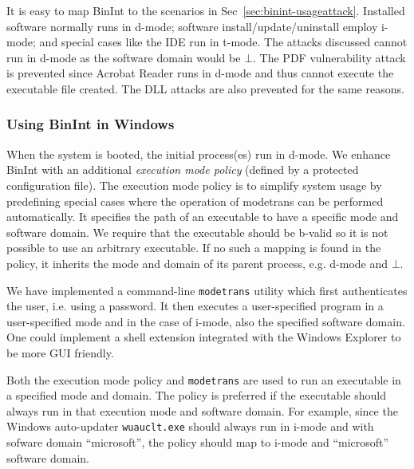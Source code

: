 It is easy to map BinInt to the scenarios in Sec~\ref{sec:binint-usageattack}.
Installed software normally runs in d-mode;
software install/up\-date/uninstall employ i-mode;
and special cases like the IDE run in t-mode.
The attacks discussed cannot run in d-mode as the software
domain would be $\bot$.
The PDF vulnerability attack is prevented since Acrobat Reader
runs in d-mode and thus cannot execute the executable file created.
The DLL attacks are also prevented for the same reasons.

\subsubsection{Using BinInt in Windows}

When the system is booted, the initial process(es) run in d-mode.
We enhance  BinInt with an additional
{\em execution mode policy} (defined by a protected configuration file).
The execution mode policy is to simplify system usage by predefining
special cases where the operation of modetrans can be performed
automatically.
It specifies the path of an 
executable to have a specific mode and software domain.
We require that the executable should be b-valid so it is not possible
to use an arbitrary executable.
If no such a mapping is found in the policy, 
it inherits the mode and domain of its parent process, e.g. d-mode and $\bot$.

We have implemented a command-line {\tt modetrans} utility which
first authenticates the user, i.e. using a password.
It then executes a user-specified program in a user-specified mode and 
in the case of i-mode, also the specified software domain.
One could implement a shell extension integrated with the Windows Explorer
to be more GUI friendly.

Both the execution mode policy and {\tt modetrans} are used to run an 
executable in a specified mode and domain.
The policy is preferred if the executable should always run
in that execution mode and software domain.
For example, since the Windows auto-updater {\tt wuauclt.exe} should
always run in i-mode and with sofware domain ``microsoft'', the policy
should map 
to i-mode and ``microsoft'' software domain.
